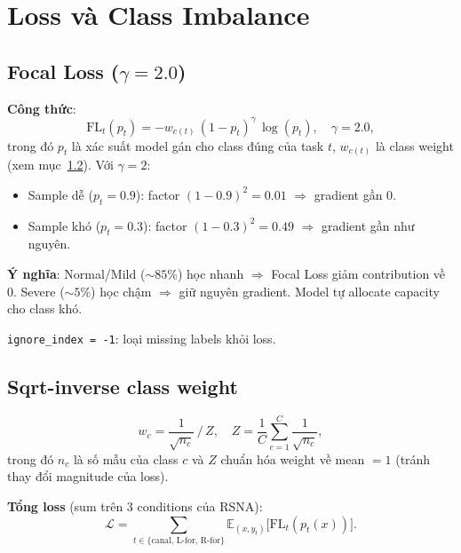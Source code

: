 \documentclass[11pt,a4paper]{article}
\begin{document}
\section{Loss và Class Imbalance}

\subsection{Focal Loss ($\gamma = 2.0$)}

\noindent\textbf{Công thức}:
\begin{equation}
\text{FL}_t(p_t) = -w_{c(t)}\,(1 - p_t)^{\gamma}\, \log(p_t),
\quad \gamma = 2.0,
\label{eq:focal_vi}
\end{equation}
trong đó $p_t$ là xác suất model gán cho class đúng của task $t$,
$w_{c(t)}$ là class weight (xem mục~\ref{subsec:cw}). Với $\gamma = 2$:
\begin{itemize}[leftmargin=*]
\item Sample dễ ($p_t = 0.9$): factor $(1-0.9)^2 = 0.01$ $\Rightarrow$
gradient gần 0.
\item Sample khó ($p_t = 0.3$): factor $(1-0.3)^2 = 0.49$ $\Rightarrow$
gradient gần như nguyên.
\end{itemize}

\noindent\textbf{Ý nghĩa}: Normal/Mild ($\sim 85\%$) học nhanh
$\Rightarrow$ Focal Loss giảm contribution về 0. Severe ($\sim 5\%$)
học chậm $\Rightarrow$ giữ nguyên gradient. Model tự allocate capacity
cho class khó.

\noindent\verb|ignore_index = -1|: loại missing labels khỏi loss.

\subsection{Sqrt-inverse class weight}
\label{subsec:cw}

\begin{equation}
w_c = \frac{1}{\sqrt{n_c}}\,/\,Z, \quad
Z = \frac{1}{C}\sum_{c=1}^{C} \frac{1}{\sqrt{n_c}},
\label{eq:classweight_vi}
\end{equation}
trong đó $n_c$ là số mẫu của class $c$ và $Z$ chuẩn hóa weight về mean
$= 1$ (tránh thay đổi magnitude của loss).

\textbf{Tổng loss} (sum trên 3 conditions của RSNA):
\begin{equation}
\mathcal{L} = \sum_{t \in \{\text{canal, L-for, R-for}\}}
              \mathbb{E}_{(x,y_t)}\big[\mathrm{FL}_t(p_t(x))\big].
\label{eq:total_loss_vi}
\end{equation}
\end{document}
